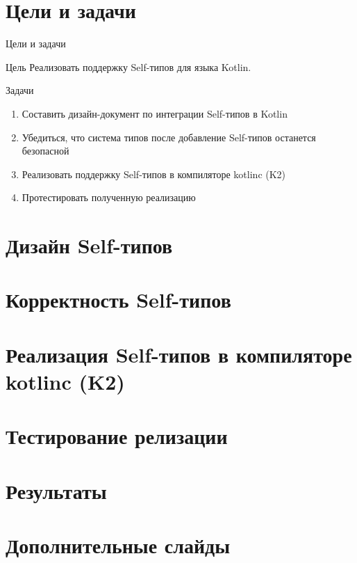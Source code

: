 \documentclass[handout,aspectratio=169,usenames,dvipsnames]{beamer}
\begin{document}
\section{Цели и задачи}

\begin{frame}[fragile]{Цели и задачи}
    \begin{block}{Цель}
        Реализовать поддержку Self-типов для языка Kotlin.
    \end{block}
    \begin{block}{Задачи}
        \begin{enumerate}
            \item Составить дизайн-документ по интеграции Self-типов в Kotlin
            \item Убедиться, что система типов после добавление Self-типов останется безопасной
            \item Реализовать поддержку Self-типов в компиляторе kotlinc (K2)
            \item Протестировать полученную реализацию
        \end{enumerate}
    \end{block}
\end{frame}

\section{Дизайн Self-типов}

\section{Корректность Self-типов}

\section{Реализация Self-типов в компиляторе kotlinc (K2)}

\section{Тестирование релизации}

\section{Результаты}

\appendix

\section{Дополнительные слайды}
\end{document}
